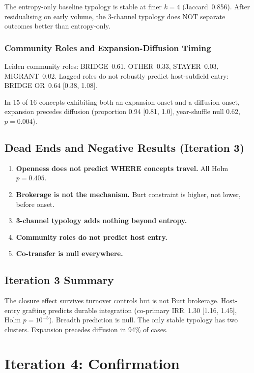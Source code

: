 \documentclass[11pt,letterpaper]{article}
\begin{document}
The entropy-only baseline typology is stable at finer $k = 4$ (Jaccard~0.856). After residualising on early volume, the 3-channel typology does NOT separate outcomes better than entropy-only.

\subsubsection{Community Roles and Expansion-Diffusion Timing}

Leiden community roles: BRIDGE~0.61, OTHER~0.33, STAYER~0.03, MIGRANT~0.02. Lagged roles do not robustly predict host-subfield entry: BRIDGE OR~0.64 [0.38, 1.08].

In 15 of 16 concepts exhibiting both an expansion onset and a diffusion onset, expansion precedes diffusion (proportion 0.94 [0.81, 1.0], year-shuffle null 0.62, $p = 0.004$).

\subsection{Dead Ends and Negative Results (Iteration 3)}

\begin{enumerate}
\item \textbf{Openness does not predict WHERE concepts travel.} All Holm $p = 0.405$.
\item \textbf{Brokerage is not the mechanism.} Burt constraint is higher, not lower, before onset.
\item \textbf{3-channel typology adds nothing beyond entropy.}
\item \textbf{Community roles do not predict host entry.}
\item \textbf{Co-transfer is null everywhere.}
\end{enumerate}

\subsection{Iteration 3 Summary}

The closure effect survives turnover controls but is not Burt brokerage. Host-entry grafting predicts durable integration (co-primary IRR~1.30 [1.16, 1.45], Holm $p = 10^{-5}$). Breadth prediction is null. The only stable typology has two clusters. Expansion precedes diffusion in 94\% of cases.


\section{Iteration 4: Confirmation}
\label{sec:iter4}
\end{document}
